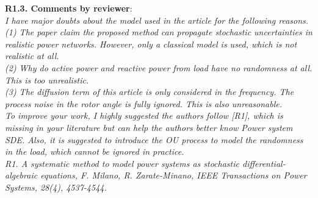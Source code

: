 \documentclass[12pt,onecolumn]{IEEEtran}
\begin{document}
\noindent
{\bf R1.3. Comments by reviewer}:\\
{\em I have major doubts about the model used in the article for the following reasons.\\
(1)     The paper claim the proposed method can propagate stochastic uncertainties in realistic power networks. However, only a classical model is used, which is not realistic at all.\\
(2)     Why do active power and reactive power from load have no randomness at all. This is too unrealistic.\\
(3)     The diffusion term of this article is only considered in the frequency. The process noise in the rotor angle is fully ignored. This is also unreasonable.\\
To improve your work, I highly suggested the authors follow [R1], which is missing in your literature but can help the authors better know Power system SDE.  Also, it is suggested to introduce the OU process to model the randomness in the load, which cannot be ignored in practice.\\
R1. A systematic method to model power systems as stochastic differential-algebraic equations, F. Milano, R. Zarate-Minano, IEEE Transactions on Power Systems, 28(4), 4537-4544.}
\end{document}
